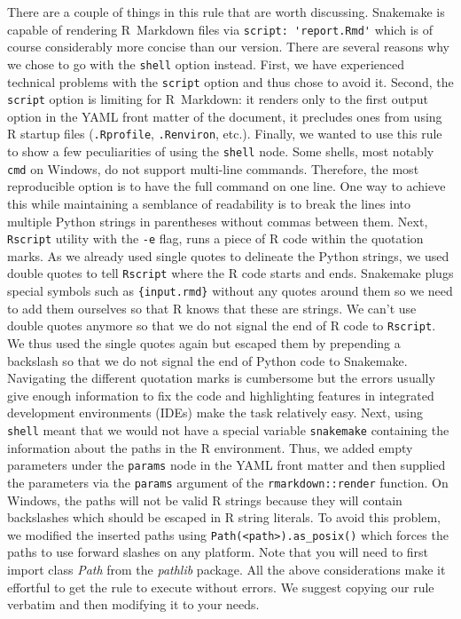 \documentclass[a4paper,man,floatsintext,natbib]{apa6}
\begin{document}
There are a couple of things in this rule that are worth discussing. Snakemake is capable of rendering R~Markdown files via \verb|script: 'report.Rmd'| which is of course considerably more concise than our version. There are several reasons why we chose to go with the \verb|shell| option instead. First, we have experienced technical problems with the \verb|script| option and thus chose to avoid it. Second, the \verb|script| option is limiting for R~Markdown: it renders only to the first output option in the YAML front matter of the document, it precludes ones from using R startup files (\verb|.Rprofile|, \verb|.Renviron|, etc.). Finally, we wanted to use this rule to show a few peculiarities of using the \verb|shell| node. Some shells, most notably \verb|cmd| on Windows, do not support multi-line commands. Therefore, the most reproducible option is to have the full command on one line. One way to achieve this while maintaining a semblance of readability is to break the lines into multiple Python strings in parentheses without commas between them. Next, \verb|Rscript| utility with the \verb|-e| flag, runs a piece of R code within the quotation marks. As we already used single quotes to delineate the Python strings, we used double quotes to tell \verb|Rscript| where the R code starts and ends. Snakemake plugs special symbols such as \verb|{input.rmd}| without any quotes around them so we need to add them ourselves so that R knows that these are strings. We can't use double quotes anymore so that we do not signal the end of R code to \verb|Rscript|. We thus used the single quotes again but escaped them by prepending a backslash so that we do not signal the end of Python code to Snakemake. Navigating the different quotation marks is cumbersome but the errors usually give enough information to fix the code and highlighting features in integrated development environments (IDEs) make the task relatively easy. Next, using \verb|shell| meant that we would not have a special variable \verb|snakemake| containing the information about the paths in the R environment. Thus, we added empty parameters under the \verb|params| node in the YAML front matter and then supplied the parameters via the \verb|params| argument of the \verb|rmarkdown::render| function. On Windows, the paths will not be valid R strings because they will contain backslashes which should be escaped in R string literals. To avoid this problem, we modified the inserted paths using \verb|Path(<path>).as_posix()| which forces the paths to use forward slashes on any platform. Note that you will need to first import class \emph{Path} from the \emph{pathlib} package. All the above considerations make it effortful to get the rule to execute without errors. We suggest copying our rule verbatim and then modifying it to your needs.
\end{document}
